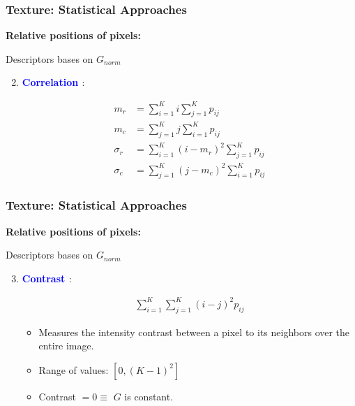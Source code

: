 \documentclass[english,11pt,table,handout]{beamer}
\begin{document}
\frame
{
	\frametitle{Texture: Statistical Approaches}

	\textbf{Relative positions of pixels: }
	\newline
	\begin{block}{Descriptors bases on $G_{norm}$}
		\begin{enumerate}
			\setcounter{enumi}{1}
			\item \textbf{\textcolor{blue}{Correlation } }:
			
			\begin{equation}
			\begin{split}
			\nonumber
			m_r &= \sum_{i=1}^{K}{i \sum_{j=1}^{K}{p_{ij} } } \\
			m_c &= \sum_{j=1}^{K}{j \sum_{i=1}^{K}{p_{ij} } } \\
			\sigma_r &= \sum_{i=1}^{K}{(i - m_r)^2 \sum_{j=1}^{K}{p_{ij} } } \\
			\sigma_c &= \sum_{j=1}^{K}{(j - m_c)^2 \sum_{i=1}^{K}{p_{ij} } } 
			\end{split}
			\end{equation}
			
			
			
		\end{enumerate}
		
	\end{block}
}

\frame
{
	\frametitle{Texture: Statistical Approaches}
	\large
	\textbf{Relative positions of pixels: }
	\newline
	\begin{block}{Descriptors bases on $G_{norm}$}
		\begin{enumerate}
			\setcounter{enumi}{2}
			\item \textbf{\textcolor{blue}{Contrast } }:
			
			\begin{equation}
			\begin{split}
			\nonumber
			\sum_{i=1}^{K}{ \sum_{j=1}^{K} { (i-j)^2p_{ij} } }
			\end{split}
			\end{equation}
			
			\begin{itemize}
				\item Measures the intensity contrast between a pixel to its neighbors over the entire image.
				\item Range of values: $[0, (K-1)^2]$
				\item Contrast $= 0 \equiv$ $G$ is constant.
				
			\end{itemize}
			
		\end{enumerate}
		
	\end{block}
}
\end{document}
